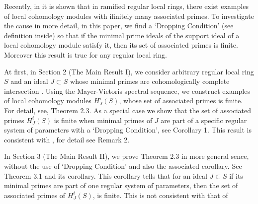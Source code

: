 \documentclass[10pt]{amsart}
\theoremstyle{plain}
\theoremstyle{definition}
\newcommand{\func}[1]{\mathrm{#1} \,}
\newcommand{\Ass}{\func{Ass}}
\begin{document}
Recently, in \cite{Ma} it is shown that in ramified regular local rings, there exist examples of local cohomology modules with ifinitely many associated primes. To investigate the cause in more detail, in this paper, we find a `Dropping Condition' (see definition inside) so that if the minimal prime ideals of the support ideal of a local cohomology module satisfy it, then its set of associated primes is finite. Moreover this result is true for any regular local ring. 

At first, in Section 2 (The Main Result I), we consider arbitrary regular local ring $S$ and an ideal $J\subset S$ whose minimal primes are cohomologically complete intersection \cite{HeSc}. Using the Mayer-Vietoris spectral sequence, we construct examples of local cohomology modules $H^i_J (S)$, whose set of associated primes is finite. For detail, see, Theorem 2.3. As a special case we show that the set of associated primes $H^i_J (S)$ is finite when minimal primes of $J$ are part of a specific regular system of parameters with a `Dropping Condition', see Corollary 1. This result is consistent with \cite{Ma}, for detail see Remark 2.%



In Section 3 (The Main Result II), we prove Theorem 2.3 in more general sence, without the use of `Dropping Condition' and also the associated corollary. See Theorem 3.1 and its corollary. This corollary tells that for an ideal $J\subset S$ if its minimal primes are part of one regular system of parameters, then the set of associated primes of $H^i_J (S)$, is finite. This is not consistent with that of \cite{Ma}
\end{document}
